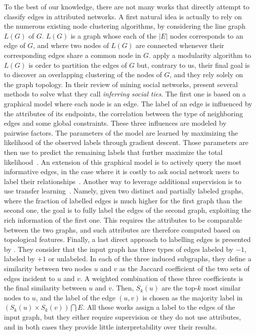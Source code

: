 To the best of our knowledge, there are not many works that directly attempt to classify edges in
attributed networks. A first natural idea is actually to rely on the numerous existing node clustering
algorithms, by considering the line graph $L(G)$ of $G$. $L(G)$ is a graph whose each of the $|E|$
nodes corresponds to an edge of $G$, and where two nodes of $L(G)$ are connected whenever their
corresponding edges share a common node in $G$. \Textcite{LineGraph09} apply a modularity algorithm
to $L(G)$ is order to partition the edges of $G$ but, contrary to us, their final goal is to
discover an overlapping clustering of the nodes of $G$, and they rely solely on the graph topology.
In their review of mining social networks, \textcite[Section 2.3]{SemanticMining15} present several
methods to solve what they call \emph{inferring social ties}. The first one is based on a graphical
model where each node is an edge. The label of an edge is influenced by the attributes of its
endpoints, the correlation between the type of neighboring edges and some global constraints. These
three influences are modeled by pairwise factors. The parameters of the model are learned by
maximizing the likelihood of the observed labels through gradient descent. Those parameters are then
use to predict the remaining labels that further maximize the total
likelihood~\autocite{graphicalModelTies11}. An extension of this graphical model is to actively
query the most informative edges, in the case where it is costly to ask social network users to label
their relationships~\autocite{Zhuang2012}. Another way to leverage additional supervision is to use
transfer learning~\autocite{transferTiesPred16}. Namely, given two distinct and partially labeled
graphs, where the fraction of labelled edges is much higher for the first graph than the second one, the goal
is to fully label the edges of the second graph, exploiting the rich information of the first one.
This requires the attributes to be comparable between the two graphs, and such attributes are
therefore computed based on topological features. Finally, a last direct approach to labelling edges
is presented by \textcite{Aggarwal2016a}. They consider that the input graph has three types of
edges labeled by $-1$, labeled by $+1$ or unlabeled. In each of the three induced subgraphs, they
define a similarity between two nodes $u$ and $v$ as the Jaccard coefficient of the two sets of
edges incident to $u$ and $v$. A weighted combination of these three coefficients is the final
similarity between $u$ and $v$. Then, $S_k(u)$ are the top-$k$ most similar nodes to $u$, and the
label of the edge $(u,v)$ is chosen as the majority label in $\left( S_k(u)\times S_k(v) \right) \bigcap E$.
All these works assign a label to the edges of the input graph, but they either require supervision or
they do not use attributes, and in both cases they provide little interpretability over their results.

